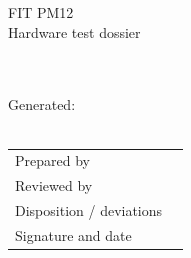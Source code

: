 \documentclass[10pt,a4paper]{article}
\newcommand{\Warning}[1]{\textbf{\textcolor{fitorange}{#1}}}
\begin{document}
\hypersetup{pageanchor=false}
\begin{titlepage}
{\color{fitblue}\Huge FIT PM12\\Hardware test dossier}\vspace{14mm}

{\Large \ReportUID}\\[5mm]
\ReportMode\\[5mm]
Generated: \ReportDate\\[10mm]
\Warning{\ReportVerdict}\\[5mm]
\ReportScope
\vfill
\begin{tabular}{p{.4\linewidth}p{.5\linewidth}}
Prepared by & \hrulefill\\[10mm]
Reviewed by & \hrulefill\\[10mm]
Disposition / deviations & \hrulefill\\[10mm]
Signature and date & \hrulefill
\end{tabular}
\end{titlepage}
\hypersetup{pageanchor=true}
\tableofcontents
\clearpage

\end{document}
